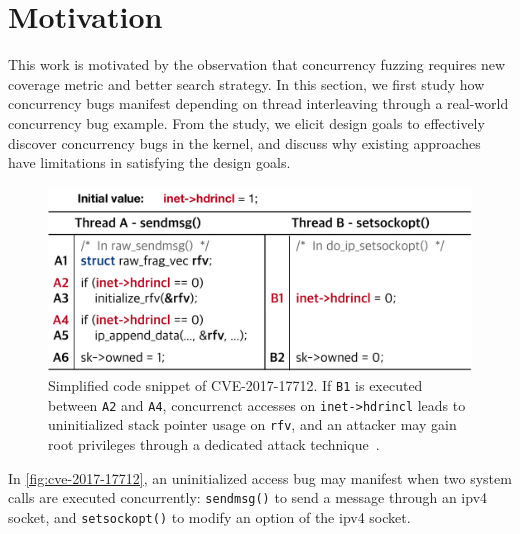 \section{Motivation}
\label{s:motivation}


This work is motivated by the observation that concurrency fuzzing 
requires new coverage metric and better search strategy. 
In this section, we first study how concurrency bugs manifest
depending on thread interleaving through a real-world concurrency bug
example.
%
From the study, we elicit design goals to effectively discover concurrency
bugs in the kernel, and discuss why existing approaches have limitations 
in satisfying the design goals.

%

%
\begin{figure}[t]
  \centering
  \includegraphics[width=0.9\linewidth]{fig/cve-2017-10661.pdf}
  \caption{Simplified code snippet of CVE-2017-17712. If \texttt{B1}
    is executed between \texttt{A2} and \texttt{A4}, concurrenct
    accesses on \texttt{inet->hdrincl} leads to uninitialized stack
    pointer usage on \texttt{rfv}, and an attacker may gain root
    privileges through a dedicated attack
    technique~\cite{stackspray}.}
  \label{fig:cve-2017-17712}
\end{figure}
%
In \autoref{fig:cve-2017-17712}, an uninitialized access bug may
manifest when two system calls are executed concurrently:
\texttt{sendmsg()} to send a message through an ipv4 socket, and
\texttt{setsockopt()} to modify an option of the ipv4 socket.

